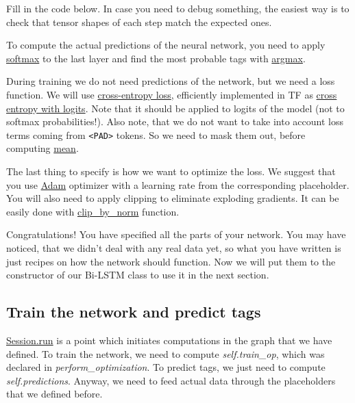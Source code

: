 \documentclass[11pt]{article}
\begin{document}
Fill in the code below. In case you need to debug something, the easiest
way is to check that tensor shapes of each step match the expected ones.

    To compute the actual predictions of the neural network, you need to
apply
\href{https://www.tensorflow.org/api_docs/python/tf/nn/softmax}{softmax}
to the last layer and find the most probable tags with
\href{https://www.tensorflow.org/api_docs/python/tf/argmax}{argmax}.

    During training we do not need predictions of the network, but we need a
loss function. We will use
\href{http://ml-cheatsheet.readthedocs.io/en/latest/loss_functions.html\#cross-entropy}{cross-entropy
loss}, efficiently implemented in TF as
\href{https://www.tensorflow.org/api_docs/python/tf/nn/softmax_cross_entropy_with_logits_v2}{cross
entropy with logits}. Note that it should be applied to logits of the
model (not to softmax probabilities!). Also note, that we do not want to
take into account loss terms coming from
\texttt{\textless{}PAD\textgreater{}} tokens. So we need to mask them
out, before computing
\href{https://www.tensorflow.org/api_docs/python/tf/reduce_mean}{mean}.

    The last thing to specify is how we want to optimize the loss. We
suggest that you use
\href{https://www.tensorflow.org/api_docs/python/tf/train/AdamOptimizer}{Adam}
optimizer with a learning rate from the corresponding placeholder. You
will also need to apply clipping to eliminate exploding gradients. It
can be easily done with
\href{https://www.tensorflow.org/api_docs/python/tf/clip_by_norm}{clip\_by\_norm}
function.

    Congratulations! You have specified all the parts of your network. You
may have noticed, that we didn't deal with any real data yet, so what
you have written is just recipes on how the network should function. Now
we will put them to the constructor of our Bi-LSTM class to use it in
the next section.

    \hypertarget{train-the-network-and-predict-tags}{%
\subsection{Train the network and predict
tags}\label{train-the-network-and-predict-tags}}

    \href{https://www.tensorflow.org/api_docs/python/tf/Session\#run}{Session.run}
is a point which initiates computations in the graph that we have
defined. To train the network, we need to compute \emph{self.train\_op},
which was declared in \emph{perform\_optimization}. To predict tags, we
just need to compute \emph{self.predictions}. Anyway, we need to feed
actual data through the placeholders that we defined before.
\end{document}
